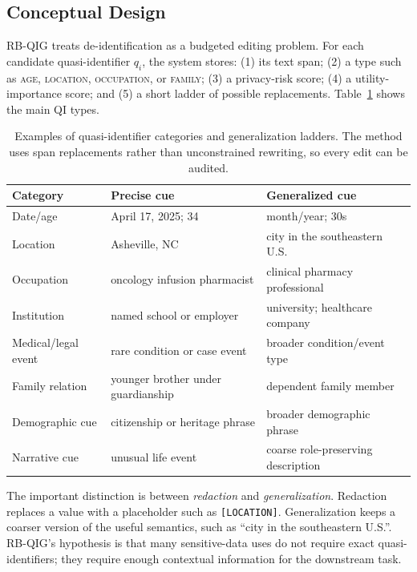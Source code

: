 \documentclass{article}
\begin{document}
\subsection{Conceptual Design}

RB-QIG treats de-identification as a budgeted editing problem. For each
candidate quasi-identifier $q_i$, the system stores: (1) its text span; (2) a
type such as \textsc{age}, \textsc{location}, \textsc{occupation}, or
\textsc{family}; (3) a privacy-risk score; (4) a utility-importance score; and
(5) a short ladder of possible replacements. Table~\ref{tab:taxonomy} shows the
main QI types.

\begin{table}[t]
\centering
\small
\caption{Examples of quasi-identifier categories and generalization ladders.
The method uses span replacements rather than unconstrained rewriting, so every
edit can be audited.}
\label{tab:taxonomy}
\begin{tabular}{lll}
\toprule
Category & Precise cue & Generalized cue \\
\midrule
Date/age & April 17, 2025; 34 & month/year; 30s \\
Location & Asheville, NC & city in the southeastern U.S. \\
Occupation & oncology infusion pharmacist & clinical pharmacy professional \\
Institution & named school or employer & university; healthcare company \\
Medical/legal event & rare condition or case event & broader condition/event type \\
Family relation & younger brother under guardianship & dependent family member \\
Demographic cue & citizenship or heritage phrase & broader demographic phrase \\
Narrative cue & unusual life event & coarse role-preserving description \\
\bottomrule
\end{tabular}
\end{table}

The important distinction is between \emph{redaction} and
\emph{generalization}. Redaction replaces a value with a placeholder such as
\texttt{[LOCATION]}. Generalization keeps a coarser version of the useful
semantics, such as ``city in the southeastern U.S.''. RB-QIG's hypothesis is
that many sensitive-data uses do not require exact quasi-identifiers; they
require enough contextual information for the downstream task.
\end{document}
